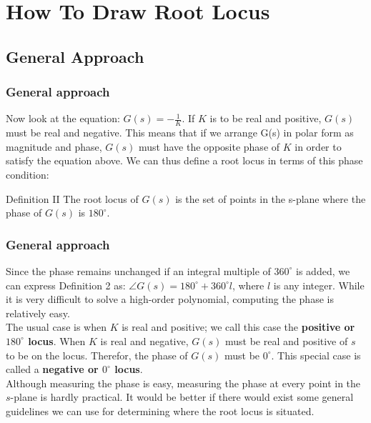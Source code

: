\section{How To Draw Root Locus}

\subsection{General Approach}

\begin{frame}
\frametitle{General approach}
	Now look at the equation: $G(s) = -\frac{1}{K}$. If $K$ is to be real and positive, $G(s)$ must be real and negative. This means that if we arrange G(s) in polar form as magnitude and phase, $G(s)$ must have the opposite phase of $K$ in order to satisfy the equation above. We can thus define a root locus in terms of this phase condition:  
	\vspace{0.5em}
	\begin{block}{Definition II}
		The root locus of $G(s)$ is the set of points in the s-plane where the phase of $G(s)$ is $180^{\circ}$.	
	\end{block}
\end{frame}

\begin{frame}
\frametitle{General approach}
	Since the phase remains unchanged if an integral multiple of $360^{\circ}$ is added, we can express Definition 2 as: $\angle G(s) = 180^{\circ} + 360^{\circ}l$, where $l$ is any integer. While it is very difficult to solve a high-order polynomial, computing the phase is relatively easy.\\
	\vspace{1em}
	The usual case is when $K$ is real and positive; we call this case the \textbf{positive or $180^{\circ}$ locus}. When $K$ is real and negative, $G(s)$ must be real and positive of $s$ to be on the locus. Therefor, the phase of $G(s)$ must be $0^{\circ}$. This special case is called a \textbf{negative or $0^{\circ}$ locus}.\\
	\vspace{1em}
	Although measuring the phase is easy, measuring the phase at every point in the $s$-plane is hardly practical. It would be better if there would exist some general guidelines we can use for determining where the root locus is situated.
\end{frame}

